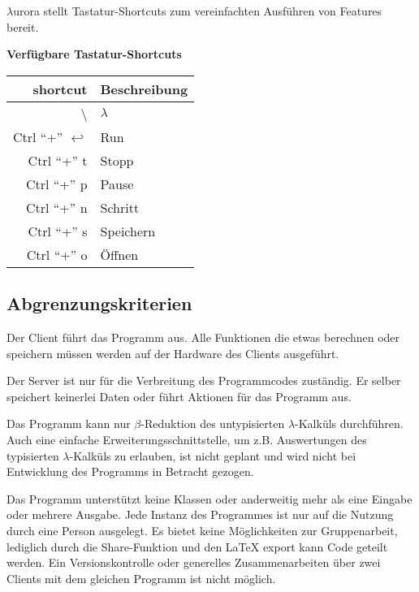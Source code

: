 \documentclass[parskip=full,11pt,twoside]{scrartcl}
\begin{document}
$\lambda$urora stellt Tastatur-Shortcuts zum vereinfachten Ausführen von Features bereit.

\textbf{Verfügbare Tastatur-Shortcuts}

\label{shortcuts}
\begin{tabular}{|r|l|}

    \hline
    shortcut & Beschreibung \\ \hline
    \textbackslash & $\lambda$ \\ \hline
    Ctrl \enquote{+} $\hookleftarrow$ & Run \\ \hline
    Ctrl \enquote{+} t & Stopp \\ \hline
    Ctrl \enquote{+} p & Pause \\ \hline
    Ctrl \enquote{+} n & Schritt \\ \hline
    Ctrl \enquote{+} s & Speichern \\ \hline
    Ctrl \enquote{+} o & Öffnen \\ \hline

\end{tabular}



\subsection{Abgrenzungskriterien}

Der Client führt das Programm aus. Alle Funktionen die etwas berechnen oder speichern müssen werden auf der Hardware des Clients ausgeführt.

Der Server ist nur für die Verbreitung des Programmcodes zuständig. Er selber speichert keinerlei Daten oder führt Aktionen für das Programm aus.

Das Programm kann nur $\beta$-Reduktion des untypisierten $\lambda$-Kalküls durchführen. Auch eine einfache Erweiterungsschnittstelle, um z.B. Auswertungen des typisierten $\lambda$-Kalküls zu erlauben, ist nicht geplant und wird nicht bei Entwicklung des Programms in Betracht gezogen.

Das Programm unterstützt keine Klassen oder anderweitig mehr als eine Eingabe oder mehrere Ausgabe.
Jede Instanz des Programmes ist nur auf die Nutzung durch eine Person ausgelegt. Es bietet keine Möglichkeiten zur Gruppenarbeit, lediglich durch die Share-Funktion und den LaTeX export kann Code geteilt werden.
\newline
Ein Versionskontrolle oder generelles Zusammenarbeiten über zwei Clients mit dem gleichen Programm ist nicht möglich.
\end{document}
